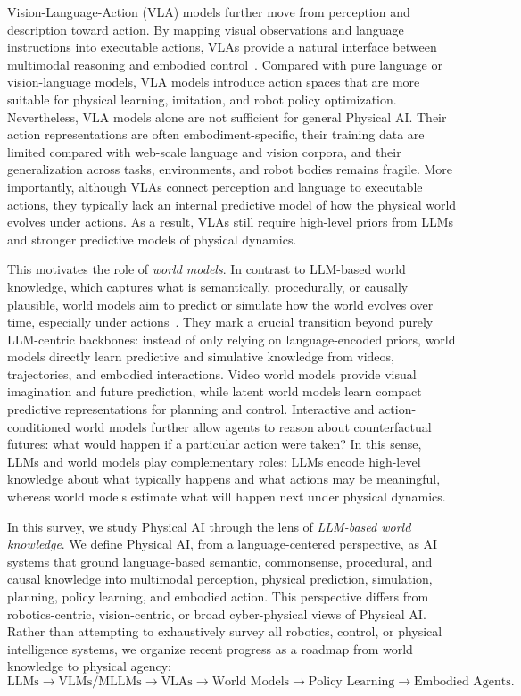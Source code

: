 Vision-Language-Action (VLA) models further move from perception and description toward action. 
By mapping visual observations and language instructions into executable actions, VLAs provide a natural interface between multimodal reasoning and embodied control~\citep{brohan2023rt2,driess2023palm,kim2024openvla}. 
Compared with pure language or vision-language models, VLA models introduce action spaces that are more suitable for physical learning, imitation, and robot policy optimization. 
Nevertheless, VLA models alone are not sufficient for general Physical AI. 
Their action representations are often embodiment-specific, their training data are limited compared with web-scale language and vision corpora, and their generalization across tasks, environments, and robot bodies remains fragile. 
More importantly, although VLAs connect perception and language to executable actions, they typically lack an internal predictive model of how the physical world evolves under actions. 
As a result, VLAs still require high-level priors from LLMs and stronger predictive models of physical dynamics.

This motivates the role of \emph{world models}. 
In contrast to LLM-based world knowledge, which captures what is semantically, procedurally, or causally plausible, world models aim to predict or simulate how the world evolves over time, especially under actions~\citep{ha2018world,lecun2022path}. 
They mark a crucial transition beyond purely LLM-centric backbones: instead of only relying on language-encoded priors, world models directly learn predictive and simulative knowledge from videos, trajectories, and embodied interactions. 
Video world models provide visual imagination and future prediction, while latent world models learn compact predictive representations for planning and control. 
Interactive and action-conditioned world models further allow agents to reason about counterfactual futures: what would happen if a particular action were taken? 
In this sense, LLMs and world models play complementary roles: LLMs encode high-level knowledge about what typically happens and what actions may be meaningful, whereas world models estimate what will happen next under physical dynamics.

In this survey, we study Physical AI through the lens of \emph{LLM-based world knowledge}. 
We define Physical AI, from a language-centered perspective, as AI systems that ground language-based semantic, commonsense, procedural, and causal knowledge into multimodal perception, physical prediction, simulation, planning, policy learning, and embodied action. 
This perspective differs from robotics-centric, vision-centric, or broad cyber-physical views of Physical AI. 
Rather than attempting to exhaustively survey all robotics, control, or physical intelligence systems, we organize recent progress as a roadmap from world knowledge to physical agency:
\begin{equation}
    \text{LLMs} \rightarrow \text{VLMs/MLLMs} \rightarrow \text{VLAs} \rightarrow \text{World Models} \rightarrow \text{Policy Learning} \rightarrow \text{Embodied Agents}.
\end{equation}

